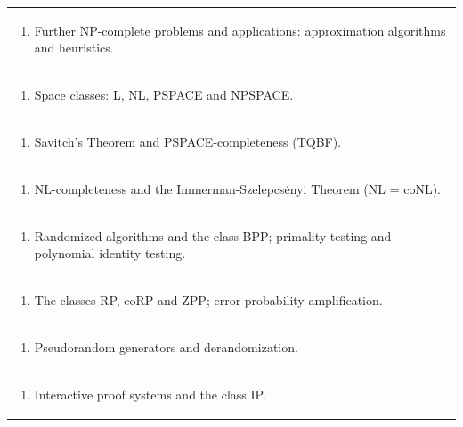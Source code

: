 \documentclass[11pt]{article}
\begin{document}
\begin{center}
\begin{longtable}{|p{4cm}|p{4cm}|p{4cm}|p{4cm}|}
\multicolumn{4}{|p{\dimexpr 16cm + 6\tabcolsep\relax}|}{\begin{enumerate}[start=17]\item Further NP-complete problems and applications: approximation algorithms and heuristics.\end{enumerate}}\\
\multicolumn{4}{|p{\dimexpr 16cm + 6\tabcolsep\relax}|}{\begin{enumerate}[start=18]\item Space classes: L, NL, PSPACE and NPSPACE.\end{enumerate}}\\
\multicolumn{4}{|p{\dimexpr 16cm + 6\tabcolsep\relax}|}{\begin{enumerate}[start=19]\item Savitch's Theorem and PSPACE-completeness (TQBF).\end{enumerate}}\\
\multicolumn{4}{|p{\dimexpr 16cm + 6\tabcolsep\relax}|}{\begin{enumerate}[start=20]\item NL-completeness and the Immerman-Szelepcsényi Theorem (NL = coNL).\end{enumerate}}\\
\multicolumn{4}{|p{\dimexpr 16cm + 6\tabcolsep\relax}|}{\begin{enumerate}[start=21]\item Randomized algorithms and the class BPP; primality testing and polynomial identity testing.\end{enumerate}}\\
\multicolumn{4}{|p{\dimexpr 16cm + 6\tabcolsep\relax}|}{\begin{enumerate}[start=22]\item The classes RP, coRP and ZPP; error-probability amplification.\end{enumerate}}\\
\multicolumn{4}{|p{\dimexpr 16cm + 6\tabcolsep\relax}|}{\begin{enumerate}[start=23]\item Pseudorandom generators and derandomization.\end{enumerate}}\\
\multicolumn{4}{|p{\dimexpr 16cm + 6\tabcolsep\relax}|}{\begin{enumerate}[start=24]\item Interactive proof systems and the class IP.\end{enumerate}}\\

\end{longtable}
\end{center}
\end{document}

